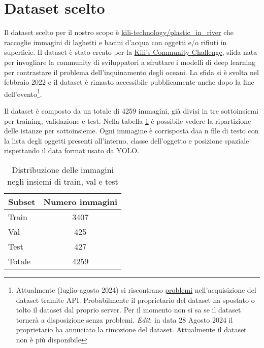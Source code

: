 \section{Dataset scelto}

Il dataset scelto per il nostro scopo è \href{https://huggingface.co/datasets/kili-technology/plastic_in_river}{kili-technology/plastic\_in\_river}
che raccoglie immagini di laghetti e bacini d'acqua con oggetti e/o rifiuti in superficie. 
Il dataset è stato creato per la \href{https://kili-technology.com/data-labeling/machine-learning/kili-s-community-challenge-plastic-in-river-dataset}{Kili's Community Challenge},
sfida nata per invogliare la community di sviluppatori a sfruttare i modelli di deep learning per contrastare il problema dell'inquinamento degli oceani. 
La sfida si è svolta nel febbraio 2022 e il dataset è rimasto accessibile pubblicamente anche dopo la fine 
dell'evento\footnote[1]{Attualmente (luglio-agosto 2024) si riscontrano \href{https://huggingface.co/datasets/kili-technology/plastic_in_river/discussions/2}{problemi} nell'acquisizione del dataset tramite API. Probabilmente il proprietario del dataset 
ha spostato o tolto il dataset dal proprio server. Per il momento non si sa se il dataset tornerà a disposizione senza problemi. \textit{Edit}: in data 28 Agosto 2024 il proprietario ha annuciato la 
rimozione del dataset. Attualmente il dataset non è più disponibile}. 

Il dataset è composto da un totale di 4259 immagini, già divisi in tre sottoinsiemi per training, validazione e test. Nella tabella \ref{table:1} 
è possibile vedere la ripartizione delle istanze per sottoinsieme. Ogni immagine è corrisposta daa n file di testo con 
la lista degli oggetti presenti all'interno, classe dell'oggetto e posizione spaziale rispettando il data format usato da YOLO.

\begin{table}[h!]
    \centering
    \begin{tabular}{ lc } 
     \hline
     \textbf{Subset} & \textbf{Numero immagini} \\ 
     \hline
     Train & 3407 \\ 
     Val & 425 \\ 
     Test & 427 \\ 
     \hline
     Totale & 4259 \\
     \hline
    \end{tabular}
    \caption{Distribuzione delle immagini negli insiemi di train, val e test }
\label{table:1}
    \end{table}

